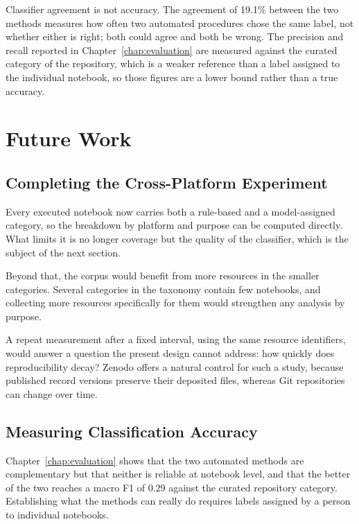 Classifier agreement is not accuracy. The agreement of 19.1\% between the two methods measures how often two automated procedures chose the same label, not whether either is right; both could agree and both be wrong. The precision and recall reported in Chapter~\ref{chap:evaluation} are measured against the curated category of the repository, which is a weaker reference than a label assigned to the individual notebook, so those figures are a lower bound rather than a true accuracy.

\section{Future Work}

\subsection{Completing the Cross-Platform Experiment}
\label{sec:future-experiment}

Every executed notebook now carries both a rule-based and a model-assigned category, so the breakdown by platform and purpose can be computed directly. What limits it is no longer coverage but the quality of the classifier, which is the subject of the next section.

Beyond that, the corpus would benefit from more resources in the smaller categories. Several categories in the taxonomy contain few notebooks, and collecting more resources specifically for them would strengthen any analysis by purpose.

A repeat measurement after a fixed interval, using the same resource identifiers, would answer a question the present design cannot address: how quickly does reproducibility decay? Zenodo offers a natural control for such a study, because published record versions preserve their deposited files, whereas Git repositories can change over time.

\subsection{Measuring Classification Accuracy}
\label{sec:future-classification}

Chapter~\ref{chap:evaluation} shows that the two automated methods are complementary but that neither is reliable at notebook level, and that the better of the two reaches a macro F1 of 0.29 against the curated repository category. Establishing what the methods can really do requires labels assigned by a person to individual notebooks.

